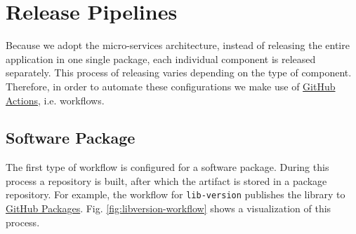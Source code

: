 
\section{Release Pipelines}
Because we adopt the micro-services architecture, instead of releasing the entire application in one single package, each individual component is released separately. This process of releasing varies depending on the type of component. Therefore, in order to automate these configurations we make use of {\color{blue} \href{https://docs.github.com/en/actions/using-workflows}{GitHub Actions}}, i.e. workflows.

\subsection{Software Package}
The first type of workflow is configured for a software package. During this process a repository is built, after which the artifact is stored in a package repository. For example, the workflow for \texttt{lib-version} publishes the library to {\color{blue} \href{https://github.com/features/packages}{GitHub Packages}}. Fig. {\color{red} \ref{fig:libversion-workflow}} shows a visualization of this process.

